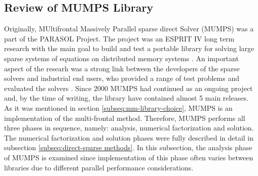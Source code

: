 \subsection{Review of MUMPS Library}
\label{subseq:mumps-review}




Originally, MUltifrontal Massively Parallel sparse direct Solver (MUMPS) was a part of the PARASOL Project. The project was an ESPRIT IV long term research with the main goal to build and test a portable library for solving large sparse systems of equations on distributed memory systems \cite{PARASOL}. An important aspect of the researh was a strong link between the developers of the sparse solvers and industrial end users, who provided a range of test problems and evaluated the solvers \cite{MUMPS:description}. Since 2000 MUMPS had continued as an ongoing project and, by the time of writing, the library have contained almost 5 main releases.\\



As it was mentioned in section \ref{subseq:mm-library-choice}, MUMPS is an implementation of the multi-frontal method. Therefore, MUMPS performs all three phases in sequence, namely: analysis, numerical factorization and solution. The numerical factorization and solution phases were fully described in detail in subsection \ref{subseq:direct-sparse methods}. In this subsection, the analysis phase of MUMPS is examined since implementation of this phase often varies between libraries due to different parallel performance considerations.\\



